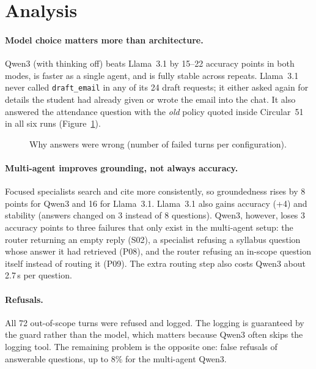\documentclass[10pt,a4paper]{article}
\newcommand{\code}[1]{\texttt{\small #1}}
\begin{document}
\section{Analysis}
\paragraph{Model choice matters more than architecture.}
Qwen3 (with thinking off) beats Llama~3.1 by 15--22 accuracy points in both modes, is faster as a single agent,
and is fully stable across repeats. Llama~3.1 never called \code{draft\_email} in any of its 24 draft requests; it
either asked again for details the student had already given or wrote the email into the chat. It also answered the
attendance question with the \emph{old} policy quoted inside Circular~51 in all six runs (Figure~\ref{fig:failures}).

\begin{figure}[H]
\centering

\caption{Why answers were wrong (number of failed turns per configuration).}
\label{fig:failures}
\end{figure}

\paragraph{Multi-agent improves grounding, not always accuracy.}
Focused specialists search and cite more consistently, so groundedness rises by 8 points for Qwen3 and 16 for
Llama~3.1. Llama~3.1 also gains accuracy (+4) and stability (answers changed on 3 instead of 8 questions). Qwen3,
however, loses 3 accuracy points to three failures that only exist in the multi-agent setup: the router returning
an empty reply (S02), a specialist refusing a syllabus question whose answer it had retrieved (P08), and the router
refusing an in-scope question itself instead of routing it (P09). The extra routing step also costs Qwen3 about
2.7\,s per question.

\paragraph{Refusals.}
All 72 out-of-scope turns were refused and logged. The logging is guaranteed by the guard rather than the model,
which matters because Qwen3 often skips the logging tool. The remaining problem is the opposite one: false refusals
of answerable questions, up to 8\% for the multi-agent Qwen3.
\end{document}
